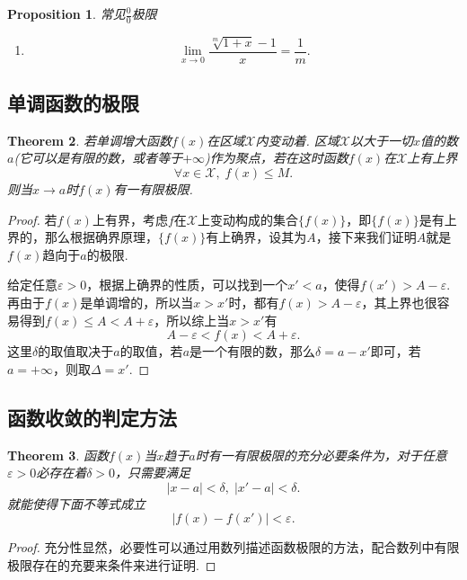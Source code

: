 \documentclass{article}
\newtheorem{theorem}{Theorem}[section]
\newtheorem{proposition}[theorem]{Proposition}
\begin{document}
\begin{proposition}
\rm {\color{red}常见$\frac{0}{0}$极限}
\begin{enumerate}
	\item 
	$$
	\lim\limits_{x \rightarrow 0} \frac{\sqrt[m]{1+x}-1}{x} = \frac{1}{m}.
	$$
\end{enumerate}
\end{proposition}

\subsection{单调函数的极限}

\begin{theorem}
\rm 若单调增大函数$f(x)$在区域$\mathcal{X}$内变动着. 区域$\mathcal{X}$以大于一切$x$值的数$a$(它可以是有限的数，或者等于$+\infty$)作为聚点，若在这时函数$f(x)$在$\mathcal{X}$上有上界
$$
\forall x \in \mathcal{X},\;f(x) \leq M.
$$
则当$x \rightarrow a$时$f(x)$有一有限极限. 
\end{theorem}

\begin{proof}
若$f(x)$上有界，考虑$f$在$\mathcal{X}$上变动构成的集合$\{f(x)\}$，即$\{f(x)\}$是有上界的，那么根据确界原理，$\{f(x)\}$有上确界，设其为$A$，接下来我们证明$A$就是$f(x)$趋向于$a$的极限.

给定任意$\varepsilon > 0$，根据上确界的性质，可以找到一个$x' < a$，使得$f(x') > A-\varepsilon$. 再由于$f(x)$是单调增的，所以当$x > x'$时，都有$f(x) > A -\varepsilon$，其上界也很容易得到$f(x) \leq A < A+\varepsilon$，所以综上当$x > x'$有
$$
A-\varepsilon < f(x) < A+\varepsilon.
$$
这里$\delta$的取值取决于$a$的取值，若$a$是一个有限的数，那么$\delta = a-x'$即可，若$a = +\infty$，则取$\Delta = x'$. 
\end{proof}

\subsection{函数收敛的判定方法}

\begin{theorem}
\rm 函数$f(x)$当$x$趋于$a$时有一有限极限的充分必要条件为，对于任意$\varepsilon > 0$必存在着$\delta > 0$，只需要满足
$$
|x-a| < \delta,\; |x'-a| < \delta.
$$
就能使得下面不等式成立
$$
|f(x)-f(x')| < \varepsilon.
$$
\end{theorem}

\begin{proof}
{\color{blue}充分性显然，必要性可以通过用数列描述函数极限的方法，配合数列中有限极限存在的充要来条件来进行证明}.
\end{proof}
\end{document}

